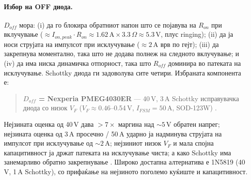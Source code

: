 \documentclass[11pt,a4paper]{article}
\newcommand{\eng}[1]{\textenglish{#1}}
\begin{document}
\paragraph{Избор на OFF диода.} $D_{off}$ мора: (i) да го блокира обратниот напон што се појавува на $R_{on}$ при вклучување ($\approx I_{on,peak}\cdot R_{on} \approx 1.62\,\mathrm{A}\times 3.3\,\Omega \approx 5.3$\,V, плус \eng{ringing}); (ii) да ја носи струјата на импулсот при исклучување ($\approx 2$\,A врв по гејт); (iii) да закрепнува моментално, така што не додава полнеж на следното вклучување; и (iv) да има ниска динамичка отпорност, така што $R_{off}$ доминира во патеката на исклучување. \eng{Schottky} диода ги задоволува сите четири. Избраната компонента е:
\begin{quote}
\textbf{$D_{off}$ = Nexperia PMEG4030ER} --- 40\,V, 3\,A \eng{Schottky} исправувачка диода со низок $V_{F}$ ($V_{F}\approx 0.46$--0.54\,V, $I_{FSM}=50$\,A, SOD-123W) \cite{ref12}.
\end{quote}
Нејзината оценка од 40\,V дава $>7\times$ маргина над $\sim 5$\,V обратен напрег; нејзината оценка од 3\,A просечно / 50\,A ударно ја надминува струјата на импулсот при исклучување од $\sim 2$\,A; нејзиниот низок $V_F$ и мала спојна капацитивност ја држат патеката на исклучување чиста; а како \eng{Schottky} има занемарливо обратно закрепнување \cite{ref12}. Широко достапна алтернатива е 1N5819 (40\,V, 1\,A \eng{Schottky}), со прифаќање на нејзиното поголемо куќиште и капацитивност.
\end{document}

